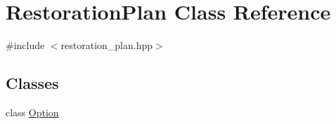 \hypertarget{class_restoration_plan}{}\section{Restoration\+Plan Class Reference}
\label{class_restoration_plan}


{\ttfamily \#include $<$restoration\+\_\+plan.\+hpp$>$}

\subsection*{Classes}
\begin{DoxyCompactItemize}
\item 
class \hyperlink{class_restoration_plan_1_1_option}{Option}
\end{DoxyCompactItemize}
